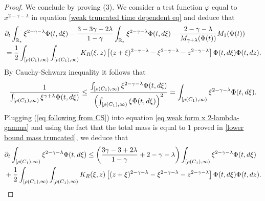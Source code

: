 \documentclass[10pt,a4paper]{amsart}
\newcommand{\der}{\textup{d}}
\begin{document}
\begin{proof}
We conclude by proving (3). 
We consider a test function $\varphi $ equal to $x^{2-\gamma - \lambda} $ in equation \eqref{weak truncated time dependent eq} and deduce that
\begin{align} \label{eq weak form x 2-lambda-gamma} 
&\partial_t \int_{\mathbb{R}_{\ast}} \xi^{2-\gamma - \lambda }\Phi(t,\der \xi) - \frac{3-3\gamma- 2 \lambda}{1-\gamma}\int_{\mathbb{R}_{\ast}}\xi^{2-\gamma - \lambda }\Phi(t,\der \xi) 
- \frac{ 2-\gamma -\lambda }{M_{\gamma+\lambda}(\Phi(t)) } M_{1}(\Phi(t))  \\
&= \frac{1}{2}\int_{[ \rho(C_1), \infty)}\int_{[ \rho(C_1), \infty)} K_R(\xi,z) \left[(z+\xi)^{2-\gamma -\lambda }- \xi^{2-\gamma -\lambda}-z^{2-\gamma -\lambda} \right] \Phi(t,\der \xi)\Phi(t,\der z).\nonumber 
\end{align} 
By Cauchy-Schwarz inequality it follows that
\begin{equation}\label{eq following from CS}
\frac{1}{\int_{[ \rho(C_1), \infty)} \xi^{\gamma +\lambda} \Phi(t,\der \xi)} \leq 
\frac{\int_{[ \rho(C_1), \infty)}\xi^{2-\gamma - \lambda } \Phi(t,\der \xi)}{ \left( \int_{[ \rho(C_1), \infty)}\xi \Phi(t,\der \xi) \right)^2} = \int_{[ \rho(C_1), \infty)} \xi^{2-\gamma - \lambda } \Phi(t,\der \xi). 
\end{equation}
Plugging (\ref{eq following from CS}) into equation \eqref{eq weak form x 2-lambda-gamma} and using the fact that the total mass is equal to $1$ proved in \eqref{lower bound mass truncated}, we deduce that
\begin{align*}
&\partial_t \int_{[ \rho(C_1), \infty)} \xi^{2-\gamma - \lambda }\Phi(t,\der \xi) \leq \left( \frac{3\gamma-3+2\lambda}{1-\gamma} + 2-\gamma -\lambda\right) \int_{[ \rho(C_1), \infty)} \xi^{2-\gamma - \lambda }\Phi(t,\der \xi) \\
&+ \frac{1}{2}\int_{[ \rho(C_1), \infty)} \int_{[ \rho(C_1), \infty)}K_R(\xi,z) \left[(z+\xi)^{2-\gamma -\lambda }- \xi^{2-\gamma -\lambda}-z^{2-\gamma -\lambda} \right] \Phi(t,\der \xi)\Phi(t,\der z).
\end{align*} 


\end{proof}
\end{document}
